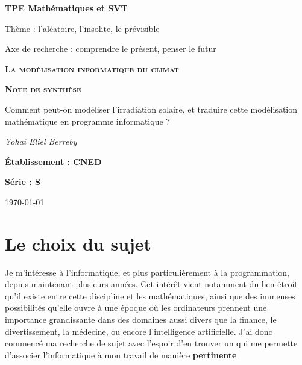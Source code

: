 \documentclass[12pt,a4paper]{article}
\begin{document}
\begin{titlepage}
	\centering
	
	{\huge\bfseries  TPE Mathématiques et SVT\par}
	\vspace{0.2cm}	
	{ \Large Thème : l'aléatoire, l'insolite, le prévisible\par }
	{ \large Axe de recherche : comprendre le présent, penser le futur\par }
	\vspace{1.5cm}

	{\bfseries \scshape\Large La modélisation informatique du climat \par}

	\vspace{2cm}

	{\Huge\bfseries  \scshape Note de synthèse \par}
	
	\vspace{2cm}

	{\Large Comment peut-on modéliser l'irradiation solaire, et traduire cette modélisation mathématique en programme informatique ?\par}

	\vspace{1cm}
	{\Large\itshape Yohaï Eliel Berreby\par}

	\vfill


	{\Large\bfseries Établissement : CNED\par}
	\vspace{0.2cm}
	{\Large \bfseries Série : S }

	\vfill

	{\large \today\par}
\end{titlepage}




\section{Le choix du sujet}


Je m'intéresse à l'informatique, et plus particulièrement à la programmation, depuis maintenant plusieurs années.
Cet intérêt vient notamment du lien étroit qu'il existe entre cette discipline et les mathématiques, ainsi que des immenses possibilités qu'elle ouvre à une époque où les ordinateurs prennent une importance grandissante dans des domaines aussi divers que la finance, le divertissement, la médecine, ou encore l'intelligence artificielle.
J'ai donc commencé ma recherche de sujet avec l'espoir d'en trouver un qui me permette d'associer l'informatique à mon travail de manière \textbf{pertinente}.
\end{document}
